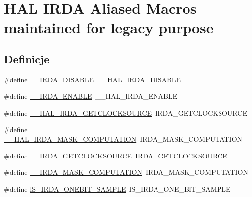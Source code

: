 \hypertarget{group___h_a_l___i_r_d_a___aliased___macros}{}\section{H\+AL I\+R\+DA Aliased Macros maintained for legacy purpose}
\label{group___h_a_l___i_r_d_a___aliased___macros}
\subsection*{Definicje}
\begin{DoxyCompactItemize}
\item 
\#define \hyperlink{group___h_a_l___i_r_d_a___aliased___macros_gae107b46fa75a7f1f5eb0734cbb24e997}{\+\_\+\+\_\+\+I\+R\+D\+A\+\_\+\+D\+I\+S\+A\+B\+LE}~\+\_\+\+\_\+\+H\+A\+L\+\_\+\+I\+R\+D\+A\+\_\+\+D\+I\+S\+A\+B\+LE
\item 
\#define \hyperlink{group___h_a_l___i_r_d_a___aliased___macros_ga30e950fea9b8b878eb721ef488572f93}{\+\_\+\+\_\+\+I\+R\+D\+A\+\_\+\+E\+N\+A\+B\+LE}~\+\_\+\+\_\+\+H\+A\+L\+\_\+\+I\+R\+D\+A\+\_\+\+E\+N\+A\+B\+LE
\item 
\#define \hyperlink{group___h_a_l___i_r_d_a___aliased___macros_ga914579d3d8a0ebefab093a54a60bdef4}{\+\_\+\+\_\+\+H\+A\+L\+\_\+\+I\+R\+D\+A\+\_\+\+G\+E\+T\+C\+L\+O\+C\+K\+S\+O\+U\+R\+CE}~I\+R\+D\+A\+\_\+\+G\+E\+T\+C\+L\+O\+C\+K\+S\+O\+U\+R\+CE
\item 
\#define \hyperlink{group___h_a_l___i_r_d_a___aliased___macros_ga5dfede2931b25ae470e8b9222cd7f276}{\+\_\+\+\_\+\+H\+A\+L\+\_\+\+I\+R\+D\+A\+\_\+\+M\+A\+S\+K\+\_\+\+C\+O\+M\+P\+U\+T\+A\+T\+I\+ON}~I\+R\+D\+A\+\_\+\+M\+A\+S\+K\+\_\+\+C\+O\+M\+P\+U\+T\+A\+T\+I\+ON
\item 
\#define \hyperlink{group___h_a_l___i_r_d_a___aliased___macros_ga91d8bac965400b5b1e0a9be356a9e477}{\+\_\+\+\_\+\+I\+R\+D\+A\+\_\+\+G\+E\+T\+C\+L\+O\+C\+K\+S\+O\+U\+R\+CE}~I\+R\+D\+A\+\_\+\+G\+E\+T\+C\+L\+O\+C\+K\+S\+O\+U\+R\+CE
\item 
\#define \hyperlink{group___h_a_l___i_r_d_a___aliased___macros_gaf50dbfc5425aee78a33582322b187616}{\+\_\+\+\_\+\+I\+R\+D\+A\+\_\+\+M\+A\+S\+K\+\_\+\+C\+O\+M\+P\+U\+T\+A\+T\+I\+ON}~I\+R\+D\+A\+\_\+\+M\+A\+S\+K\+\_\+\+C\+O\+M\+P\+U\+T\+A\+T\+I\+ON
\item 
\#define \hyperlink{group___h_a_l___i_r_d_a___aliased___macros_ga152f6e8c07efa028364631d5eab0f9ed}{I\+S\+\_\+\+I\+R\+D\+A\+\_\+\+O\+N\+E\+B\+I\+T\+\_\+\+S\+A\+M\+P\+LE}~I\+S\+\_\+\+I\+R\+D\+A\+\_\+\+O\+N\+E\+\_\+\+B\+I\+T\+\_\+\+S\+A\+M\+P\+LE
\end{DoxyCompactItemize}


